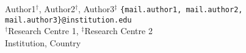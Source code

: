 \oneauthor
{Author1$^{\dag}$,
  Author2$^{\dag}$,
  Author3$^{\ddag}$}
{{\tt \{mail.author1, mail.author2, mail.author3\}@institution.edu} \\
  $^\dag$Research Centre 1, 
  $^\ddag$Research Centre 2 \\
  Institution, Country}
